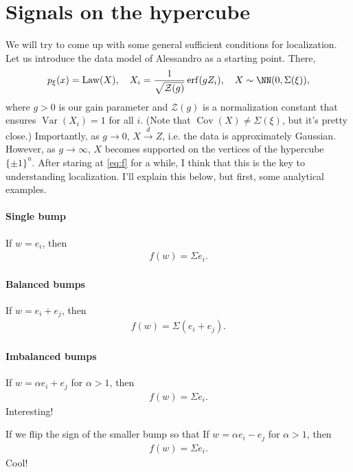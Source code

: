 \documentclass{article}
\begin{document}
\section{Signals on the hypercube}
We will try to come up with some general sufficient conditions for localization.
Let us introduce the data model of Alessandro as a starting point.
There,
\begin{align}
  p_{\xi}(x) = \operatorname{Law}(X), \quad X_i = \frac{1}{\sqrt{\mathcal{Z}(g)}} \operatorname{erf}(g Z_i), \quad X \sim \NN(0, \Sigma(\xi)),
\end{align}
where $g > 0$ is our gain parameter and $\mathcal{Z}(g)$ is a normalization constant that ensures $\operatorname{Var}(X_i) = 1$ for all $i$.
(Note that $\operatorname{Cov}(X) \neq \Sigma(\xi)$, but it's pretty close.)
Importantly, as $g \to 0$, $X \overset{d}{\to} Z$, i.e. the data is approximately Gaussian.
However, as $g \to \infty$, $X$ becomes supported on the vertices of the hypercube $\{ \pm 1 \}^n$.
After staring at \cref{eq:f} for a while, I think that this is the key to understanding localization.
I'll explain this below, but first, some analytical examples.

\paragraph*{Single bump}
If $w = e_i$, then
\begin{align}
  f(w) = \Sigma e_i.
\end{align}

\paragraph*{Balanced bumps}
If $w = e_i + e_j$, then
\begin{align}
  f(w) = \Sigma (e_i + e_j).
\end{align}

\paragraph*{Imbalanced bumps}
If $w = \alpha e_i + e_j$ for $\alpha > 1$, then
\begin{align}
  f(w) = \Sigma e_i.
\end{align}
Interesting!

If we flip the sign of the smaller bump so that
If $w = \alpha e_i - e_j$ for $\alpha > 1$, then
\begin{align}
  f(w) = \Sigma e_i.
\end{align}
Cool!
\end{document}
